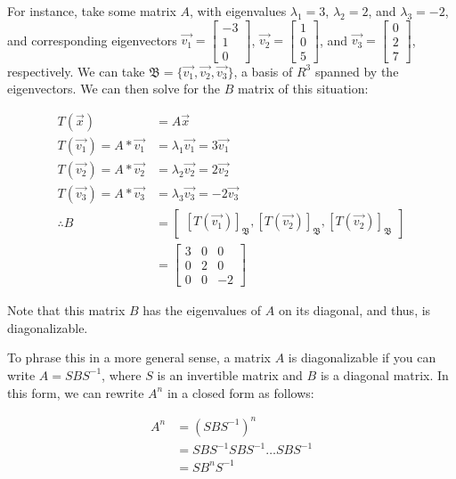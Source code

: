 \documentclass[12pt]{article}
\begin{document}
{For instance, take some matrix $A$, with eigenvalues $\lambda_1 = 3$, $\lambda_2 = 2$, and $\lambda_3 = -2$, and corresponding eigenvectors $\vec{v_1} = \begin{bmatrix}
    -3\\
    1\\
    0\end{bmatrix}$, $\vec{v_2}=\begin{bmatrix}
    1\\
    0\\
    5\end{bmatrix}$, and $\vec{v_3}=\begin{bmatrix}
    0\\
    2\\
    7\end{bmatrix}$, respectively. We can take $\mathfrak{B} = \{\vec{v_1}, \vec{v_2}, \vec{v_3}\}$, a basis of $R^3$ spanned by the eigenvectors. We can then solve for the $B$ matrix of this situation:

\begin{align*}
    T(\vec{x}) &= A\vec{x}\\
    T(\vec{v_1}) = A * \vec{v_1} &= \lambda_1\vec{v_1} = 3 \vec{v_1}\\
    T(\vec{v_2}) = A * \vec{v_2} &= \lambda_2\vec{v_2} = 2 \vec{v_2}\\
    T(\vec{v_3}) = A * \vec{v_3} &= \lambda_3\vec{v_3} = -2 \vec{v_3}\\
    \therefore B &= \begin{bmatrix}
        [T(\vec{v_1})]_{\mathfrak{B}}, [T(\vec{v_2})]_{\mathfrak{B}}, [T(\vec{v_2})]_{\mathfrak{B}}
    \end{bmatrix}\\
    &= \begin{bmatrix}
        3 & 0 & 0\\
        0 & 2 & 0\\
        0 & 0 & -2
    \end{bmatrix}
\end{align*}

Note that this matrix $B$ has the eigenvalues of $A$ on its diagonal, and thus, is diagonalizable.

To phrase this in a more general sense, a matrix $A$ is diagonalizable if you can write $A = SBS^{-1}$, where $S$ is an invertible matrix and $B$ is a diagonal matrix. In this form, we can rewrite $A^n$ in a closed form as follows:

\begin{align*}
    A^n &= (SBS^{-1})^n\\
    &= SBS^{-1}SBS^{-1} \dots SBS^{-1}\\
    &= SB^{n}S^{-1}\\
\end{align*}

}
\end{document}
